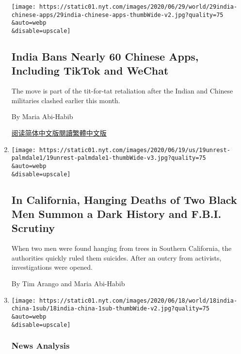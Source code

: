 \begin{enumerate}
  \texttt{[image: https://static01.nyt.com/images/2020/06/29/world/29india-chinese-apps/29india-chinese-apps-thumbWide-v2.jpg?quality=75\\\&auto=webp\\\&disable=upscale]}

  \hypertarget{india-bans-nearly-60-chinese-apps-including-tiktok-and-wechat}{%
  \subsection{India Bans Nearly 60 Chinese Apps, Including TikTok and
  WeChat}\label{india-bans-nearly-60-chinese-apps-including-tiktok-and-wechat}}

  The move is part of the tit-for-tat retaliation after the Indian and
  Chinese militaries clashed earlier this month.

  By Maria Abi-Habib

  \href{https://cn.nytimes.com/world/20200630/tik-tok-banned-india-china/}{阅读简体中文版}\href{https://cn.nytimes.com/world/20200630/tik-tok-banned-india-china/zh-hant/}{閱讀繁體中文版}
\item
  \href{/2020/06/19/us/hanging-deaths-california.html}{}

  \texttt{[image: https://static01.nyt.com/images/2020/06/19/us/19unrest-palmdale1/19unrest-palmdale1-thumbWide-v3.jpg?quality=75\\\&auto=webp\\\&disable=upscale]}

  \hypertarget{in-california-hanging-deaths-of-two-black-men-summon-a-dark-history-and-fbi-scrutiny}{%
  \subsection{In California, Hanging Deaths of Two Black Men Summon a
  Dark History and F.B.I.
  Scrutiny}\label{in-california-hanging-deaths-of-two-black-men-summon-a-dark-history-and-fbi-scrutiny}}

  When two men were found hanging from trees in Southern California, the
  authorities quickly ruled them suicides. After an outcry from
  activists, investigations were opened.

  By Tim Arango and Maria Abi-Habib
\item
  \href{/2020/06/19/world/asia/india-china-border.html}{}

  \texttt{[image: https://static01.nyt.com/images/2020/06/18/world/18india-china-1sub/18india-china-1sub-thumbWide-v2.jpg?quality=75\\\&auto=webp\\\&disable=upscale]}

  \hypertarget{news-analysis}{%
  \subsubsection{News Analysis}\label{news-analysis}}


\end{enumerate}
